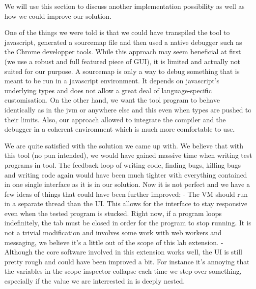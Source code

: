 We will use this section to discuss another implementation possibility as well as how we could improve our solution.

One of the things we were told is that we could have transpiled the tool to javascript, generated a sourcemap file and then used a native debugger such as the Chrome developper tools. While this approach may seem beneficial at first (we use a robust and full featured piece of GUI), it is limited and actually not suited for our purpose. A sourcemap is only a way to debug something that is meant to be run in a javascript environment. It depends on javascript's underlying types and does not allow a great deal of language-specific customisation. On the other hand, we want the tool program to behave identically as in the jvm or anywhere else and this even when types are pushed to their limits. Also, our approach allowed to integrate the compiler and the debugger in a coherent environment which is much more comfortable to use.

We are quite satisfied with the solution we came up with. We believe that with this tool (no pun intended), we would have gained massive time when writing test programs in tool. The feedback loop of writing code, finding bugs, killing bugs and writing code again would have been much tighter with everything contained in one single interface as it is in our solution. Now it is not perfect and we have a few ideas of things that could have been further improved:
- The VM should run in a separate thread than the UI. This allows for the interface to stay responsive even when the tested program is stucked. Right now, if a program loops indefinitely, the tab must be closed in order for the program to stop running. It is not a trivial modification and involves some work with web workers and messaging, we believe it's a little out of the scope of this lab extension.
- Although the core software involved in this extension works well, the UI is still pretty rough and could have been improved a bit. For instance it's annoying that the variables in the scope inspector collapse each time we step over something, especially if the value we are interrested in is deeply nested.
